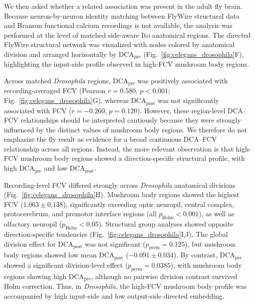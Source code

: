 \documentclass[9pt,twocolumn,twoside]{pnas-new}
\begin{document}
We then asked whether a related association was present in the adult fly brain. Because neuron-by-neuron identity matching between FlyWire structural data and Branson functional calcium recordings is not available, the analysis was performed at the level of matched side-aware Ito anatomical regions. The directed FlyWire structural network was visualized with nodes colored by anatomical division and arranged horizontally by $\mathrm{DCA}_{\mathrm{pre}}$ (Fig.~\ref{fig:celegans_drosophila}F), highlighting the input-side profile observed in high-FCV mushroom body regions.


Across matched \textit{Drosophila} regions, $\mathrm{DCA}_{\mathrm{pre}}$ was positively associated with recording-averaged FCV (Pearson $r = 0.580$, $p < 0.001$; Fig.~\ref{fig:celegans_drosophila}G), whereas $\mathrm{DCA}_{\mathrm{post}}$ was not significantly associated with FCV ($r = -0.260$, $p = 0.120$). However, these region-level DCA--FCV relationships should be interpreted cautiously because they were strongly influenced by the distinct values of mushroom body regions. We therefore do not emphasize the fly result as evidence for a broad continuous DCA--FCV relationship across all regions. Instead, the more relevant observation is that high-FCV mushroom body regions showed a direction-specific structural profile, with high $\mathrm{DCA}_{\mathrm{pre}}$ and low $\mathrm{DCA}_{\mathrm{post}}$.


Recording-level FCV differed strongly across \textit{Drosophila} anatomical divisions (Fig.~\ref{fig:celegans_drosophila}H). Mushroom body regions showed the highest FCV ($1.063 \pm 0.138$), significantly exceeding optic neuropil, central complex, protocerebrum, and premotor interface regions (all $p_{\mathrm{Holm}} < 0.001$), as well as olfactory neuropil ($p_{\mathrm{Holm}} < 0.05$). Structural group analyses showed opposite direction-specific tendencies (Fig.~\ref{fig:celegans_drosophila}I,J). The global division effect for $\mathrm{DCA}_{\mathrm{post}}$ was not significant ($p_{\mathrm{perm}} = 0.125$), but mushroom body regions showed low mean $\mathrm{DCA}_{\mathrm{post}}$ ($-0.091 \pm 0.034$). By contrast, $\mathrm{DCA}_{\mathrm{pre}}$ showed a significant division-level effect ($p_{\mathrm{perm}} = 0.0385$), with mushroom body regions showing high $\mathrm{DCA}_{\mathrm{pre}}$, although no pairwise division contrast survived Holm correction. Thus, in \textit{Drosophila}, the high-FCV mushroom body profile was accompanied by high input-side and low output-side directed embedding.
\end{document}
